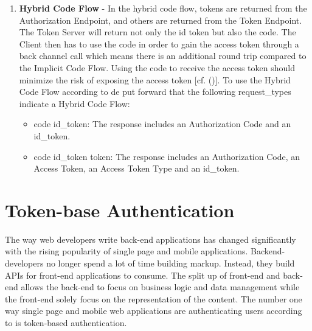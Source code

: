 {\begin{enumerate}
	According to \cite{Sakimura:2014:OpenIDConnect}, the following request\_types indicate an Implicit Code Flow:
	\begin{itemize}
		\item	id\_token: The response must include the parameter id\_token. The response does not include an Authorization Code, Access Token, or Access Token Type. 
		\item  id\_token token: The response includes an Access Token, an Access Token Type and an id\_token.
	\end{itemize}
	
	\item \textbf{Hybrid Code Flow} - In the hybrid code flow, tokens are returned from the Authorization Endpoint, and others are returned from the Token Endpoint. The Token Server will return not only the id token but also the code. The Client then has to use the code in order to gain the access token through a back channel call which means there is an additional round trip compared to the Implicit Code Flow. Using the code to receive the access token should minimize the risk of exposing the access token [cf. (\cite{Sakimura:2014:OpenIDConnect})].
	To use the Hybrid Code Flow according to de \cite{Sakimura:2014:OpenIDConnect} put forward that the following request\_types indicate a Hybrid Code Flow:
	\begin{itemize}
		\item	code id\_token: The response includes an Authorization Code and an id\_token.
		\item  code id\_token token: The response includes an Authorization Code, an Access Token, an Access Token Type and an id\_token. 
	\end{itemize} 
	
\end{enumerate}

 


\section{Token-base Authentication}

The way web developers write back-end applications has changed significantly with the rising popularity of single page and mobile applications. Backend-developers no longer spend a lot of time building markup. Instead, they build APIs for front-end applications to consume. The split up of front-end and back-end allows the back-end to focus on business logic and data management while the front-end solely focus on the representation of the content. The number one way single page and mobile web applications are authenticating users according to \cite{Tkalec:2015} is token-based authentication.

}
